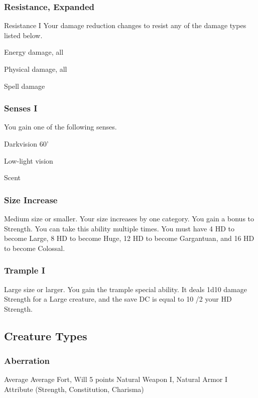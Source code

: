 \subsubsection{Resistance, Expanded}
\featpre Resistance I
\featben Your damage reduction changes to resist any of the damage types listed below.
\begin{itemize*}
    \item Energy damage, all
    \item Physical damage, all
    \item Spell damage
\end{itemize*}

\subsubsection{Senses I}
\featben You gain one of the following senses.
\begin{itemize*}
    \item Darkvision 60'
    \item Low-light vision
    \item Scent
\end{itemize*}

\subsubsection{Size Increase}
\featpre Medium size or smaller.
\featben Your size increases by one category. You gain a  bonus to Strength.
 You can take this ability multiple times. You must have 4 HD to become Large, 8 HD to become Huge, 12 HD to become Gargantuan, and 16 HD to become Colossal.

\subsubsection{Trample I}
\featpre Large size or larger.
\featben You gain the trample special ability. It deals 1d10 damage \add Strength for a Large creature, and the save DC is equal to 10 /2 your HD \add Strength.

\subsection{Creature Types}

\subsubsection{Aberration}
\tbab Average
\tsaves Average Fort, Will
 5 points
 Natural Weapon I, Natural Armor I
 Attribute (Strength, Constitution, Charisma)

